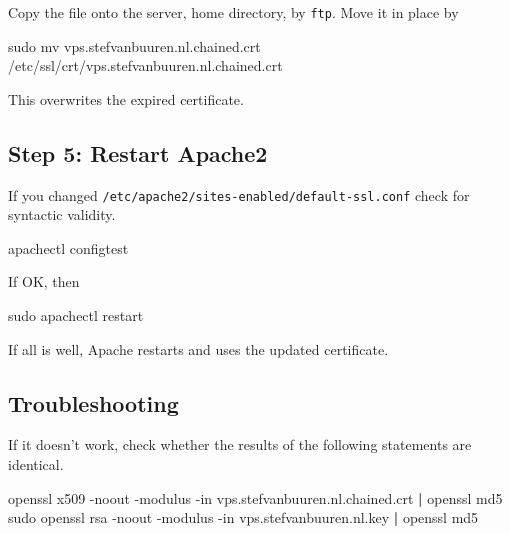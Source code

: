 \documentclass[
]{book}
\newenvironment{Shaded}{\begin{snugshade}}{\end{snugshade}}
\newcommand{\AttributeTok}[1]{\textcolor[rgb]{0.77,0.63,0.00}{#1}}
\newcommand{\ExtensionTok}[1]{#1}
\newcommand{\FunctionTok}[1]{\textcolor[rgb]{0.00,0.00,0.00}{#1}}
\newcommand{\KeywordTok}[1]{\textcolor[rgb]{0.13,0.29,0.53}{\textbf{#1}}}
\newcommand{\NormalTok}[1]{#1}
\begin{document}
Copy the file onto the server, home directory, by \texttt{ftp}. Move it in place by

\begin{Shaded}
\begin{Highlighting}[]
\FunctionTok{sudo}\NormalTok{ mv vps.stefvanbuuren.nl.chained.crt /etc/ssl/crt/vps.stefvanbuuren.nl.chained.crt}
\end{Highlighting}
\end{Shaded}

This overwrites the expired certificate.

\hypertarget{step-5-restart-apache2}{%
\subsection{Step 5: Restart Apache2}\label{step-5-restart-apache2}}

If you changed \texttt{/etc/apache2/sites-enabled/default-ssl.conf} check for syntactic validity.

\begin{Shaded}
\begin{Highlighting}[]
\ExtensionTok{apachectl}\NormalTok{ configtest}
\end{Highlighting}
\end{Shaded}

If OK, then

\begin{Shaded}
\begin{Highlighting}[]
\FunctionTok{sudo}\NormalTok{ apachectl restart}
\end{Highlighting}
\end{Shaded}

If all is well, Apache restarts and uses the updated certificate.

\hypertarget{troubleshooting}{%
\subsection{Troubleshooting}\label{troubleshooting}}

If it doesn't work, check whether the results of the following statements are identical.

\begin{Shaded}
\begin{Highlighting}[]
\ExtensionTok{openssl}\NormalTok{ x509 }\AttributeTok{{-}noout} \AttributeTok{{-}modulus} \AttributeTok{{-}in}\NormalTok{ vps.stefvanbuuren.nl.chained.crt }\KeywordTok{|} \ExtensionTok{openssl}\NormalTok{ md5}
\FunctionTok{sudo}\NormalTok{ openssl rsa }\AttributeTok{{-}noout} \AttributeTok{{-}modulus} \AttributeTok{{-}in}\NormalTok{ vps.stefvanbuuren.nl.key }\KeywordTok{|} \ExtensionTok{openssl}\NormalTok{ md5}
\end{Highlighting}
\end{Shaded}
\end{document}
